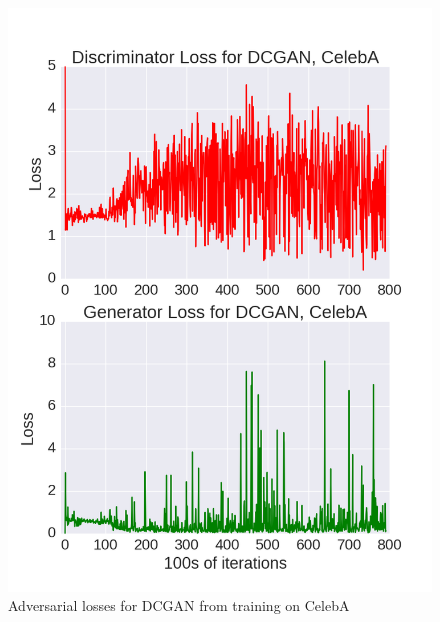 \documentclass{article}
\begin{document}
\begin{figure}[!htb]%
  \centering
  \includegraphics[width=.85\linewidth]{figures/Loss_Graph_CelebA_T=1.png}
  \caption[Figure 3]{Adversarial losses for DCGAN from training on CelebA}
  \label{fig3}
\end{figure}
\end{document}
